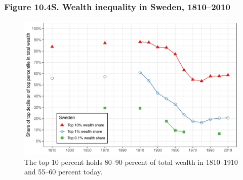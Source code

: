 \documentclass[t]{beamer}\usepackage[]{graphicx}\usepackage[]{color}
\newenvironment{knitrout}{}{} %
\begin{document}
\begin{frame}[label=Figure_10_4S]
\frametitle{Figure 10.4S. Wealth inequality in Sweden, 1810--2010}
\begin{figure}[t]
\begin{minipage}[b]{\textwidth}
\centering
\begin{knitrout}\footnotesize
{}\color{fgcolor}

{\centering \includegraphics[width=1\linewidth]{figures/color/Figure_10_4S} 

}



\end{knitrout}
\caption{The top 10 percent holds 80--90 percent of total wealth in 1810--1910 and 55--60 percent today.}
\end{minipage}
\end{figure}
\end{frame}
\end{document}
